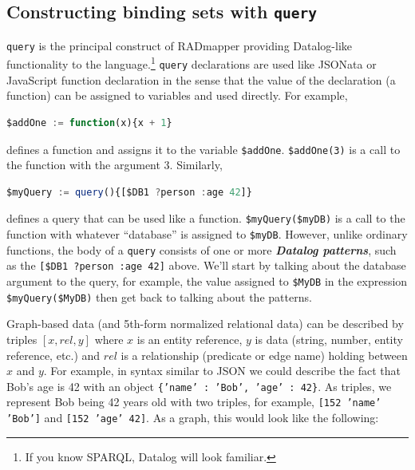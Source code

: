 \documentclass[10pt,letterpaper]{article} %
\newcommand{\stt}[1]{\texttt{#1}} %
\newcommand{\bdef}[1]{\textbf{\textit{#1}}}
\begin{document}
\subsection{Constructing binding sets with \stt{query}}

\stt{query} is the principal construct of RADmapper providing Datalog-like functionality to the language.\footnote{
  If you know SPARQL, Datalog will look familiar.}
\stt{query} declarations are used like JSONata or JavaScript function declaration in the sense that the value of the declaration (a function) can be assigned to variables and used directly.
For example,
\begin{lstlisting}[language=JavaScript,numbers=none,basicstyle=\ttfamily\scriptsize]
$addOne := function(x){x + 1}
\end{lstlisting} \vspace{-2em}
defines a function and assigns it to the variable \stt{\$addOne}.
\stt{\$addOne(3)} is a call to the function with the argument 3.
Similarly,
\begin{lstlisting}[language=JavaScript,numbers=none,basicstyle=\ttfamily\scriptsize]
$myQuery := query(){[$DB1 ?person :age 42]}
\end{lstlisting} \vspace{-2em}
defines a query that can be used like a function.
\stt{\$myQuery(\$myDB)} is a call to the function with whatever ``database'' is assigned to \stt{\$myDB}.
However, unlike ordinary functions, the body of a \stt{query} consists of one or more \bdef{Datalog patterns}, such as the \stt{[\$DB1 ?person :age 42]} above.
We'll start by talking about the database argument to the query, for example, the value assigned to \stt{\$MyDB} in the expression \stt{\$myQuery(\$MyDB)} then get back to talking about the patterns.

Graph-based data (and 5th-form normalized relational data) can be described by triples $[x,rel,y]$ where $x$ is an entity reference, $y$ is data (string, number, entity reference, etc.) and $rel$ is a relationship (predicate or edge name) holding between $x$ and $y$.
For example, in syntax similar to JSON we could describe the fact that Bob's age is 42 with an object \stt{\{'name' : 'Bob', 'age' : 42\}}.
As triples, we represent Bob being 42 years old with two triples, for example, \stt{[152 'name' 'Bob']} and \stt{[152 'age' 42]}.
As a graph, this would look like the following:
\end{document}

